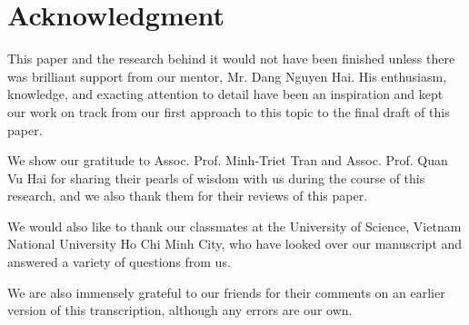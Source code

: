 \section*{Acknowledgment}
This paper and the research behind it would not have been finished unless there was brilliant support from our mentor, Mr. Dang Nguyen Hai. His enthusiasm, knowledge, and exacting attention to detail have been an inspiration and kept our work on track from our first approach to this topic to the final draft of this paper.

We show our gratitude to Assoc. Prof. Minh-Triet Tran and Assoc. Prof. Quan Vu Hai for sharing their pearls of wisdom with us during the course of this research, and we also thank them for their reviews of this paper.

We would also like to thank our classmates at the University of Science, Vietnam National University Ho Chi Minh City, who have looked over our manuscript and answered a variety of questions from us.

We are also immensely grateful to our friends for their comments on an earlier version of this transcription, although any errors are our own.
